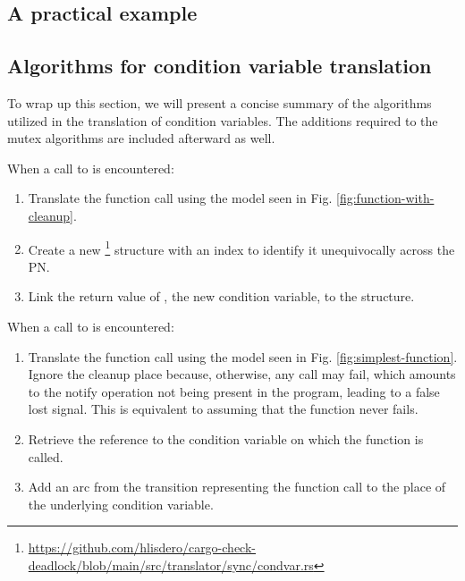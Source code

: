 \subsection{A practical example}

\subsection{Algorithms for condition variable translation}
\label{sec:condvar-algorithms}

To wrap up this section, we will present a concise summary
of the algorithms utilized in the translation of condition variables.
The additions required to the mutex algorithms are included afterward as well.

When a call to  is encountered:

\begin{enumerate}
      \item Translate the function call using the model seen in Fig. \ref{fig:function-with-cleanup}.
      \item Create a new \footnote{\url{https://github.com/hlisdero/cargo-check-deadlock/blob/main/src/translator/sync/condvar.rs}}
            structure with an index to identify it unequivocally across the \acrshort{PN}.
      \item Link the return value of ,
            the new condition variable, to the  structure.
\end{enumerate}

When a call to  is encountered:

\begin{enumerate}
      \item Translate the function call using the model seen in Fig. \ref{fig:simplest-function}.
            Ignore the cleanup place because, otherwise, any call may fail,
            which amounts to the notify operation not being present in the program,
            leading to a false lost signal.
            This is equivalent to assuming that the  function never fails.
      \item Retrieve the  reference to the condition variable
            on which the function is called.
      \item Add an arc from the transition representing the function call
            to the  place of the underlying condition variable.
\end{enumerate}

